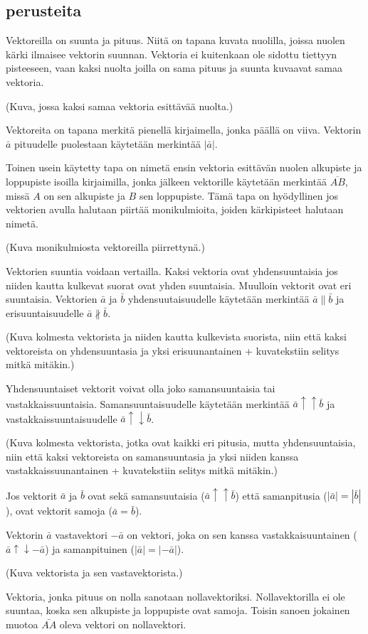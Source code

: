 \subsection{perusteita}


Vektoreilla on suunta ja pituus. Niitä on tapana kuvata nuolilla, joissa nuolen kärki ilmaisee vektorin suunnan. Vektoria ei kuitenkaan ole sidottu tiettyyn pisteeseen, vaan kaksi nuolta joilla on sama pituus ja suunta kuvaavat samaa vektoria.

(Kuva, jossa kaksi samaa vektoria esittävää nuolta.)

Vektoreita on tapana merkitä pienellä kirjaimella, jonka päällä on viiva. Vektorin $\bar{a}$ pituudelle puolestaan käytetään merkintää $|\bar{a}|$.

Toinen usein käytetty tapa on nimetä ensin vektoria esittävän nuolen alkupiste ja loppupiste isoilla kirjaimilla, jonka jälkeen vektorille käytetään merkintää $\overline{AB}$, missä $A$ on sen alkupiste ja $B$ sen loppupiste. Tämä tapa on hyödyllinen jos vektorien avulla halutaan piirtää monikulmioita, joiden kärkipisteet halutaan nimetä.

(Kuva monikulmiosta vektoreilla piirrettynä.)

Vektorien suuntia voidaan vertailla. Kaksi vektoria ovat yhdensuuntaisia jos niiden kautta kulkevat suorat ovat yhden suuntaisia. Muulloin vektorit ovat eri suuntaisia. Vektorien $\bar{a}$ ja $\bar{b}$ yhdensuutaisuudelle käytetään merkintää $\bar{a} \parallel \bar{b}$ ja erisuuntaisuudelle $\bar{a} \nparallel \bar{b}$.

(Kuva kolmesta vektorista ja niiden kautta kulkevista suorista, niin että kaksi vektoreista on yhdensuuntasia ja yksi erisuunantainen + kuvatekstiin selitys mitkä mitäkin.)

Yhdensuuntaiset vektorit voivat olla joko samansuuntaisia tai vastakkaissuuntaisia. Samansuuntaisuudelle käytetään merkintää $\bar{a} \uparrow \uparrow  \bar{b}$ ja vastakkaissuuntaisuudelle $\bar{a} \uparrow \downarrow \bar{b}$.

(Kuva kolmesta vektorista, jotka ovat kaikki eri pitusia, mutta yhdensuuntaisia, niin että kaksi vektoreista on samansuuntasia ja yksi niiden kanssa vastakkaissuunantainen + kuvatekstiin selitys mitkä mitäkin.)

Jos vektorit $\bar{a}$ ja $\bar{b}$ ovat sekä samansuutaisia ($\bar{a} \uparrow \uparrow  \bar{b}$) että samanpitusia ($|\bar{a}| = |\bar{b}|$), ovat vektorit samoja ($\bar{a} = \bar{b}$).

Vektorin $\bar{a}$ vastavektori $-\bar{a}$ on vektori, joka on sen kanssa vastakkaisuuntainen ($\bar{a} \uparrow \downarrow -\bar{a}$) ja samanpituinen ($|\bar{a}| = |-\bar{a}|$).

(Kuva vektorista ja sen vastavektorista.)

Vektoria, jonka pituus on nolla sanotaan nollavektoriksi. Nollavektorilla ei ole suuntaa, koska sen alkupiste ja loppupiste ovat samoja. Toisin sanoen jokainen muotoa $\bar{AA}$ oleva vektori on nollavektori.
 